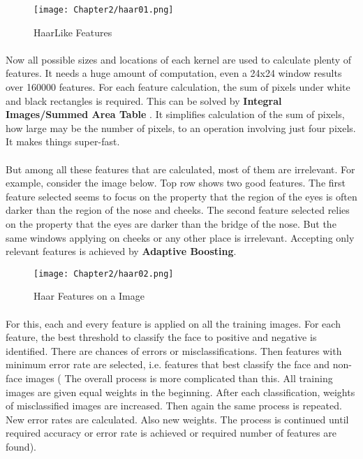 	\begin{figure}[h]
		\begin{center}
			\texttt{[image: Chapter2/haar01.png]}
			\caption{Haar\textendash Like Features}
			\label{fig:haarfeatures}
		\end{center}
	\end{figure}

	\paragraph{}Now all possible sizes and locations of each kernel are used to calculate plenty of features. It needs a huge amount of computation, even a 24x24 window results over 160000 features. For each feature calculation, the sum of pixels under white and black rectangles is required. This can be solved by \textbf{Integral Images/Summed Area Table} . It simplifies calculation of the sum of pixels, how large may be the number of pixels, to an operation involving just four pixels. It makes things super-fast.
	
	\paragraph{}But among all these features that are calculated, most of them are irrelevant. For example, consider the image below. Top row shows two good features. The first
	feature selected seems to focus on the property that the region of the eyes is often darker than the region of the nose and cheeks. The second feature
	selected relies on the property that the eyes are darker than the bridge of the nose. But the same windows applying on cheeks or any other place is irrelevant.
	Accepting only relevant features is achieved by \textbf{Adaptive Boosting}.
	
	\begin{figure}[h]
		\begin{center}
			\texttt{[image: Chapter2/haar02.png]}
			\caption{Haar Features on a Image}
			\label{fig:haarfeaturesonimage}
		\end{center}
	\end{figure}
	
	\paragraph{}For this, each and every feature is applied on all the training images. For each feature, the best threshold to classify the face to positive and negative is identified. There are chances of errors or misclassifications. Then features with minimum error rate are selected, i.e. features that best classify the face and non-face images ( The overall process is more complicated than this. All training images are given equal weights in the beginning. After each classification, weights of misclassified images are increased. Then again the same process is repeated. New error rates are calculated. Also new weights. The process is continued until required accuracy or error rate is achieved or required number of features are found).
	
